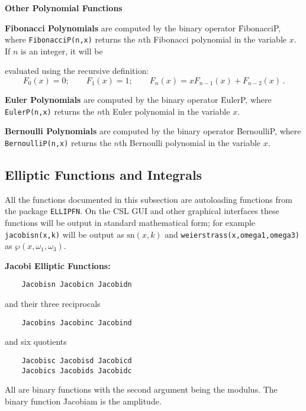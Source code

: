 \textbf{Other Polynomial Functions}
\hypertarget{operator:FIBONACCIP}{}

\textbf{Fibonacci Polynomials} are computed by the binary operator
\f{FibonacciP}, where
\texttt{FibonacciP(n,x)} returns the $n$th Fibonacci polynomial
in the variable $x$. If $n$ is an integer, it will be

evaluated using the recursive definition:
\[F_0(x) = 0;\qquad F_1(x) = 1; \qquad F_n(x) = x F_{n-1}(x) + F_{n-2}(x)\,.\]

\textbf{Euler Polynomials} are computed by the binary operator
\f{EulerP}, where\linebreak
\texttt{EulerP(n,x)} returns the $n$th Euler polynomial in the variable $x$.

\textbf{Bernoulli Polynomials} are computed by the binary operator
\f{BernoulliP}, where \texttt{BernoulliP(n,x)} returns the
$n$th Bernoulli polynomial in the variable $x$.

\subsection{Elliptic Functions and Integrals}
All the functions documented in this subsection are autoloading
functions from the package \texttt{ELLIPFN}.  On the CSL GUI and other graphical
interfaces these functions will be output in standard mathematical form;
for example \texttt{jacobisn(x,k)} will be output as $\mathrm{sn}(x,k)$ and
\texttt{weierstrass(x,omega1,omega3)} as $\wp(x,\omega_1,\omega_3)$.

\textbf{Jacobi Elliptic Functions:}
\begin{verbatim}
    Jacobisn Jacobicn Jacobidn
\end{verbatim}
and their three reciprocals
\begin{verbatim}
    Jacobins Jacobinc Jacobind
\end{verbatim}
and six quotients
\begin{verbatim}
    Jacobisc Jacobisd Jacobicd
    Jacobics Jacobids Jacobidc
\end{verbatim}
All are binary functions with the second argument being the modulus.
The binary function \f{Jacobiam} is the amplitude.

